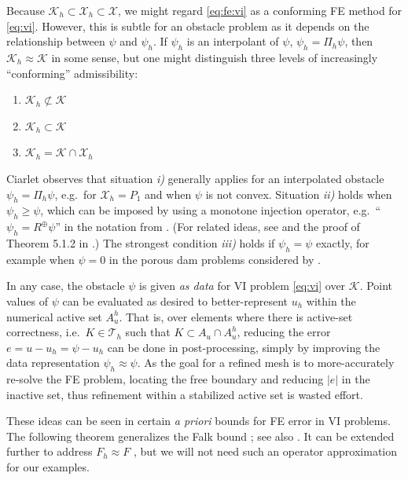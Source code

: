 \documentclass[]{interact}
\theoremstyle{plain}%
\theoremstyle{definition}
\theoremstyle{remark}
\newcommand{\cK}{\mathcal{K}}
\newcommand{\cT}{\mathcal{T}}
\newcommand{\cX}{\mathcal{X}}
\begin{document}
Because $\cK_h \subset \cX_h \subset \cX$, we might regard \eqref{eq:fe:vi} as a conforming FE method for \eqref{eq:vi}.  However, this is subtle for an obstacle problem as it depends on the relationship between $\psi$ and $\psi_h$.  If $\psi_h$ is an interpolant of $\psi$, $\psi_h = \Pi_h \psi$, then $\cK_h \approx \cK$ in some sense, but one might distinguish three levels of increasingly ``conforming'' admissibility:
\renewcommand{\labelenumi}{\emph{\roman{enumi})}}
\begin{enumerate}
\item $\cK_h \not \subset \cK$
\item $\cK_h \subset \cK$
\item $\cK_h = \cK \cap \cX_h$
\end{enumerate}
Ciarlet \cite[Figure 5.1.3]{Ciarlet2002} observes that situation \emph{i)} generally applies for an interpolated obstacle $\psi_h = \Pi_h \psi$, e.g.~for $\cX_h=P_1$ and when $\psi$ is not convex.  Situation \emph{ii)} holds when $\psi_h \ge \psi$, which can be imposed by using a monotone injection operator, e.g.~``$\psi_h = R^\oplus \psi$'' in the notation from \cite{BuelerFarrell2024}.  (For related ideas, see \cite{GraeserKornhuber2009} and the proof of Theorem 5.1.2 in \cite{Ciarlet2002}.)  The strongest condition \emph{iii)} holds if $\psi_h=\psi$ exactly, for example when $\psi=0$ in the porous dam problems considered by \cite{AinsworthOdenLee1993}.

In any case, the obstacle $\psi$ is given \emph{as data} for VI problem \eqref{eq:vi} over $\cK$.  Point values of $\psi$ can be evaluated as desired to better-represent $u_h$ within the numerical active set $A_u^h$.  That is, over elements where there is active-set correctness, i.e.~$K\in\cT_h$ such that $K \subset A_u \cap A_u^h$, reducing the error $e=u-u_h=\psi-u_h$ can be done in post-processing, simply by improving the data representation $\psi_h \approx \psi$.  As the goal for a refined mesh is to more-accurately re-solve the FE problem, locating the free boundary and reducing $|e|$ in the inactive set, thus refinement within a stabilized active set is wasted effort.

These ideas can be seen in certain \emph{a priori} bounds for FE error in VI problems.  The following theorem generalizes the Falk bound \cite{Falk1974}; see also \cite[Theorem 5.1.1]{Ciarlet2002}.  It can be extended further to address $F_h\approx F$ \cite[Theorem 6.3]{Bueler2024}, but we will not need such an operator approximation for our examples.
\end{document}
